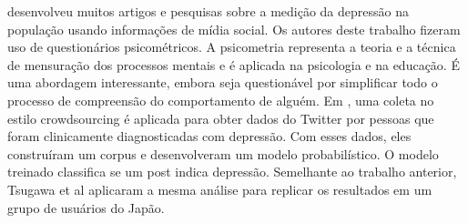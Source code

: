\documentclass[11pt, notitlepage]{article} %
\begin{document}
\cite{DeChoudhury:2013:SMM:2464464.2464480} desenvolveu muitos artigos e pesquisas sobre a medição da depressão na população usando informações de mídia social. Os autores deste trabalho fizeram uso de questionários psicométricos.
A psicometria representa a teoria e a técnica de mensuração dos processos mentais e é aplicada na psicologia e na educação. É uma abordagem interessante, embora seja questionável por simplificar todo o processo de compreensão do comportamento de alguém. Em \cite{DeChoudhury:2013:SMM:2464464.2464480}, uma coleta no estilo crowdsourcing é aplicada para obter dados do Twitter por pessoas que foram clinicamente diagnosticadas com depressão. Com esses dados, eles construíram um corpus e desenvolveram um modelo probabilístico. O modelo treinado classifica se um post indica depressão. Semelhante ao trabalho anterior, Tsugawa et al \cite{Tsugawa2015} aplicaram a mesma análise para replicar os resultados em um grupo de usuários do Japão.
\end{document}
